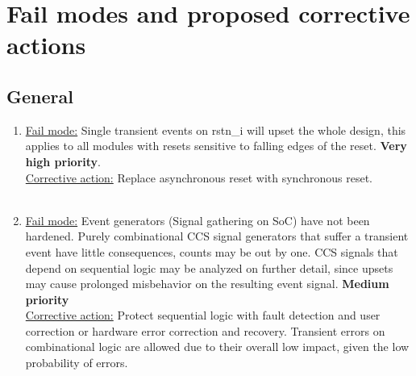 \newpage
\section{Fail modes and proposed corrective actions}
\label{chapter2}
\subsection{General}
\begin{enumerate}
\item \underline{Fail mode:} Single transient events on rstn\_i will upset the whole design, this applies to all modules with resets sensitive to falling edges of the reset. \textbf{Very high priority}.\\
\underline{Corrective action:} Replace asynchronous reset with synchronous reset.\\
\\
\item \underline{Fail mode:} Event generators (Signal gathering on SoC) have not been hardened. Purely combinational  CCS signal generators that suffer a transient event have little consequences, counts may be out by one. CCS signals that depend on sequential logic may be analyzed on further detail, since upsets may cause prolonged misbehavior on the resulting event signal. \textbf{Medium priority}\\
\underline{Corrective action:} Protect sequential logic with fault detection and user correction or hardware error correction and recovery. Transient errors on combinational logic are allowed due to their overall low impact, given the low probability of errors. 
\end{enumerate}

